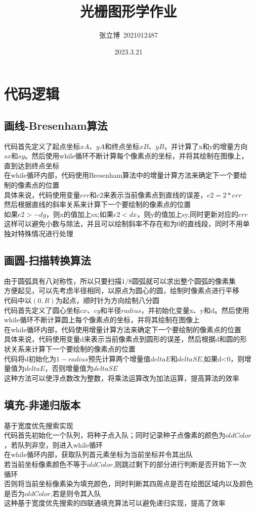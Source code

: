 \documentclass[12pt,a4paper]{article}
\title{\textbf{光栅图形学作业}}
\author{张立博\ 2021012487}
\date{2023.3.21}
\begin{document}
\maketitle

\section{代码逻辑}

\subsection*{画线-Bresenham算法}
代码首先定义了起点坐标$xA$、$yA$和终点坐标$xB$、$yB$，并计算了x和y的增量方向$sx$和$sy$。然后使用while循环不断计算每个像素点的坐标，并将其绘制在图像上，直到达到终点坐标\\
在while循环内部，代码使用Bresenham算法中的增量计算方法来确定下一个要绘制的像素点的位置\\
具体来说，代码使用变量$err$和$e2$来表示当前像素点到直线的误差，$e2 = 2 * err$\\
然后根据直线的斜率关系来计算下一个要绘制的像素点的位置\\
如果$e2 > -dy$，则x的值加上sx;如果$e2 < dx$，则y的值加上sy,同时更新对应的$err$\\
这样可以避免小数与除法，并且可以绘制斜率不存在和为0的直线段，同时不用单独对特殊情况进行处理
\subsection*{画圆-扫描转换算法}
由于圆弧具有八对称性，所以只要扫描$1/8$圆弧就可以求出整个圆弧的像素集\\
方便起见，可以先考虑半径相同，以原点为圆心的圆，绘制时像素点进行平移\\
代码中以$(0,R)$为起点，顺时针为方向绘制八分圆\\
代码首先定义了圆心坐标$cx$、$cy$和半径$radius$，并初始化变量x、y和d。然后使用while循环不断计算圆上每个像素点的坐标，并将其绘制在图像上\\
在while循环内部，代码使用增量计算方法来确定下一个要绘制的像素点的位置\\
具体来说，代码使用变量d来表示当前像素点到圆形的误差，然后根据d和圆的形状关系来计算下一个要绘制的像素点的位置\\
代码将d初始化为$1-radius$预先计算两个增量值$deltaE$和$deltaSE$,如果d<0，则增量值为$deltaE$，否则增量值为$deltaSE$\\
这种方法可以使浮点数改为整数，将乘法运算改为加法运算，提高算法的效率
\subsection*{填充-非递归版本}
基于宽度优先搜索实现\\
代码首先初始化一个队列，将种子点入队；同时记录种子点像素的颜色为$oldColor$，若队列非空，则进入while循环\\
在while循环内部，获取队列首元素坐标为当前坐标并令其出队\\
若当前坐标像素颜色不等于$oldColor$,则跳过剩下的部分进行判断是否开始下一次循环\\
否则将当前坐标像素染为填充颜色，同时判断其四周点是否在绘图区域内以及颜色是否为$oldColor$,若是则令其入队\\
这种基于宽度优先搜索的四联通填充算法可以避免递归实现，提高了效率
\end{document}
